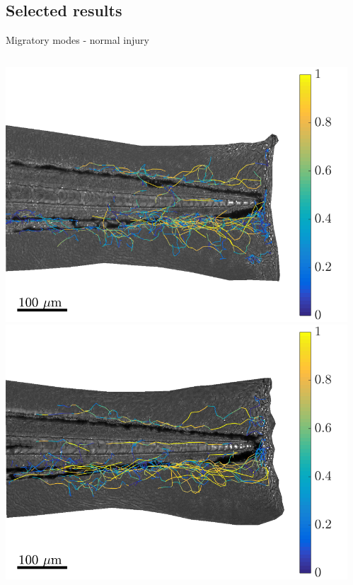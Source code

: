 \documentclass[mathserif,11pt]{beamer}
\begin{document}
\subsection{Selected results}
\begin{frame}{Migratory modes - normal injury}
\begin{columns}
	\begin{column}{0.31\textwidth}
		\vspace{-0.2cm}
		\includegraphics[scale=0.18]{Figures/mode1_fish1.png}\vfil
		\vspace{0.2cm}
		\includegraphics[scale=0.18]{Figures/mode1_fish3.png}
	\end{column}
	\begin{column}{0.31\textwidth}

\end{column}
\end{columns}
\end{frame}
\end{document}
